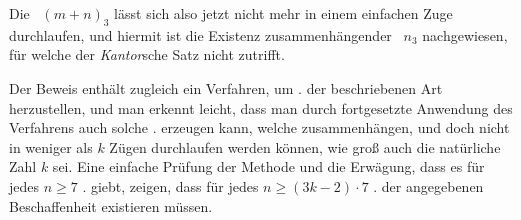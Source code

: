 \documentclass[11pt,a4paper]{article}
\begin{document}
Die \Cf\ $(m+n)_3$ lässt sich also jetzt nicht mehr in einem einfachen Zuge durchlaufen, und hiermit ist die Existenz zusammenhängender \Cff\ $n_3$ nachgewiesen, für welche der \emph{Kantor}sche Satz nicht zutrifft.

Der Beweis enthält zugleich ein Verfahren, um \Cff. der beschriebenen Art herzustellen, und man erkennt leicht, dass man durch fortgesetzte Anwendung des Verfahrens auch solche \Cff. erzeugen kann, welche zusammenhängen, und doch nicht in weniger als $k$ Zügen durchlaufen werden können, wie groß auch die natürliche Zahl $k$ sei. Eine einfache Prüfung der Methode und die Erwägung, dass es für jedes $n\geq7$ \Cff. giebt, zeigen, dass für jedes $n\geq(3k-2)\cdot7$ \Cff. der angegebenen Beschaffenheit existieren müssen.
\end{document}
